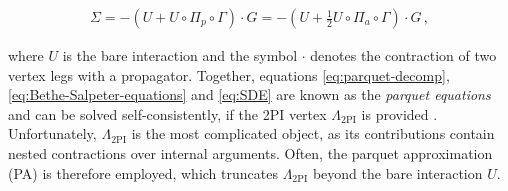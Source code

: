 \documentclass{SciPost}
\begin{document}
%
\begin{linenomath}
    \begin{align}
    \Sigma = - \left(U+U\circ\Pi_p\circ\Gamma\right)\cdot G = - \left(U+\tfrac{1}{2}U\circ\Pi_a\circ\Gamma\right)\cdot G\, ,
    \label{eq:SDE}
    \end{align}
\end{linenomath}
%
where $U$ is the bare interaction and the symbol $\cdot$ denotes the contraction of two vertex legs with a propagator.
Together, equations \eqref{eq:parquet-decomp}, \eqref{eq:Bethe-Salpeter-equations} and \eqref{eq:SDE} are known as the \textsl{parquet equations} \cite{10.1063/1.1704062, 10.1063/1.1704064} and can be solved self-consistently, if the 2PI vertex $\Lambda_{\text{2PI}}$ is provided \cite{PhysRevLett.62.961, PhysRevB.43.8044, doi:10.1142/S021797929100016X, Bickers2004}. Unfortunately, $\Lambda_{\text{2PI}}$ is the most complicated object, as its contributions contain nested contractions over internal arguments. Often, the parquet approximation (PA) is therefore employed, which truncates $\Lambda_{\text{2PI}}$ beyond the bare interaction $U$.
%
\end{document}
